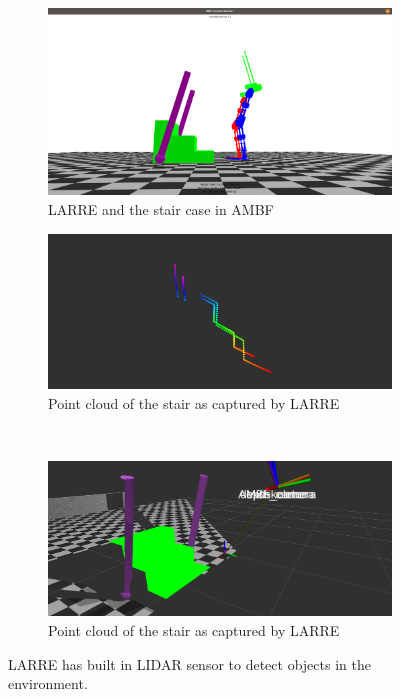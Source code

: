  \begin{figure}[h]
    \begin{subfigure}{.5\linewidth}
        \centering
        \includegraphics[scale=0.1]{images/sim/stair2.png}
        \caption{LARRE and the stair case in AMBF}
        \label{fig:exostair}
        \label{fig:sub1}
    \end{subfigure}%
    \begin{subfigure}{.5\linewidth}
       \centering
        \includegraphics[scale=0.15]{images/sim/point_cloud_stairs.png}
        \caption[Point Cloud of the Stairs]{Point cloud of the stair as captured by LARRE}
        \label{fig:LIDAR}
        \end{subfigure}\\[1ex]
    \begin{subfigure}{\linewidth}
        \centering
        \includegraphics[scale=0.15]{images/sim/point_cloud_stairs2.png}
        \caption{Point cloud of the stair as captured by LARRE}
        \label{fig:DEPTH}
    \end{subfigure}
   \caption[LIDAR built into LARREs hip]{LARRE has built in LIDAR sensor to detect objects in the environment.}
   \label{fig:sensors}
\end{figure}
 
